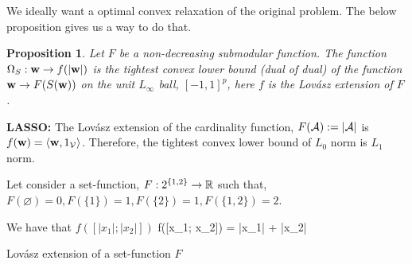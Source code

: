 \documentclass[11pt]{article}
\newtheorem{proposition}{Proposition}{\bf}{\it}
\begin{document}
We ideally want a optimal convex relaxation of the original problem. The below proposition gives us a way to do that.
\begin{proposition}
Let $F$ be a non-decreasing submodular function. The function $\Omega_{S}: {\bf w} \to f(|{\bf w}|)$ is the tightest convex lower
bound (dual of dual) of the function ${\bf w} \to F(S({\bf w}))$ on the unit $L_{\infty}$ ball, $[-1, 1]^p$, here $f$ is 
the Lovász extension of $F$.
\end{proposition}

\textbf{LASSO:} The Lovász extension of the cardinality function, $F({\cal A}) := |{\cal A}|$ is $f({\bf w}) = \langle {\bf w} , 1_{{\cal V}} \rangle$.
Therefore, the tightest convex lower bound of $L_0$ norm is $L_1$ norm.



Let consider a set-function, $F : 2^{\{1, 2\}} \to {\mathbb R}$
such that, $F(\varnothing) = 0, F(\{1\}) = 1, F(\{2\}) = 1, F(\{1, 2\}) = 2$.
  
We have that $f([|x_1|; |x_2|])$
\bd
f([x_1; x_2]) = |x_1| + |x_2|
\ed
\bfig[h!]
\centering
{}
\caption{Lovász extension of a set-function $F$}
\efig



% 
% 
\end{document}

